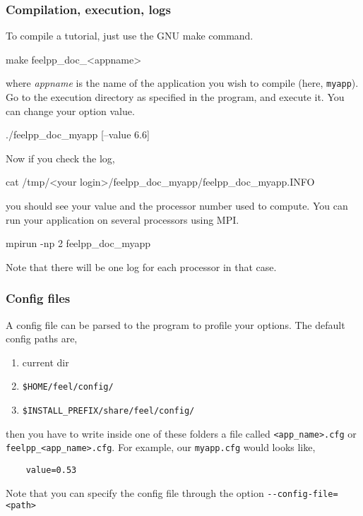 

\subsubsection{Compilation, execution, logs}

To compile a tutorial, just use the GNU make command.
%
\begin{unixcom}
    make feelpp_doc_<appname>
\end{unixcom}
%
where \textit{appname} is the name of the application you wish to
compile (here, \lstinline!myapp!).
Go to the execution directory as specified in the program,
and execute it. You can change your option value.
%
\begin{unixcom}
    ./feelpp_doc_myapp [--value 6.6]
\end{unixcom}
%
Now if you check the log,
%
\begin{unixcom}
    cat /tmp/<your login>/feelpp_doc_myapp/feelpp_doc_myapp.INFO
\end{unixcom}
%
you should see your value and the processor number used to compute.
You can run your application on several processors using MPI.
%
\begin{unixcom}
    mpirun -np 2 feelpp_doc_myapp
\end{unixcom}
%
Note that there will be one log for each processor in that case.


\subsubsection{Config files}

A config file can be parsed to the program to profile your options.
The default config paths are,
\begin{enumerate}
    \item current dir
    \item \verb|$HOME/feel/config/|
    \item \verb|$INSTALL_PREFIX/share/feel/config/|
\end{enumerate}
then you have to write inside one of these folders a file called
\lstinline!<app_name>.cfg! or \lstinline!feelpp_<app_name>.cfg!.
For example, our \lstinline!myapp.cfg! would looks like,
%
\vspace{2mm}
\begin{lstlisting}
    value=0.53
\end{lstlisting}
\vspace{2mm}
%
Note that you can specify the config file through the option \lstinline!--config-file=<path>!

